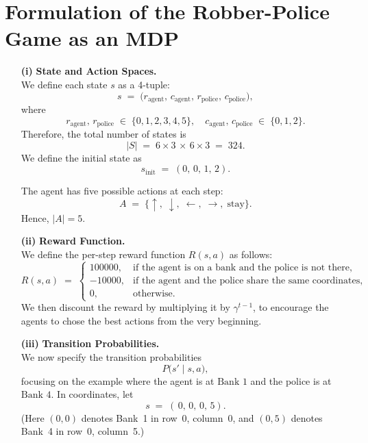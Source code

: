 \section*{Formulation of the Robber-Police Game as an MDP}

\begin{enumerate}

  \item[\textbf{(i)}]
    \textbf{State and Action Spaces.} \\
    We define each state \(s\) as a 4-tuple:
    \[
      s \;=\; \bigl(r_{\text{agent}},\,c_{\text{agent}},\,r_{\text{police}},\,c_{\text{police}}\bigr),
    \]
    where
    \[
      r_{\text{agent}},\,r_{\text{police}} \;\in\;\{0,1,2,3,4,5\},
      \quad
      c_{\text{agent}},\,c_{\text{police}} \;\in\;\{0,1,2\}.
    \]
    Therefore, the total number of states is
    \[
      |S| \;=\; 6 \times 3 \,\times\, 6 \times 3 \;=\; 324.
    \]
    We define the initial state as
    \[
      s_{\text{init}} \;=\; (0,\,0,\,1,\,2).
    \]

    The agent has five possible actions at each step:
    \[
      A \;=\; \{\uparrow,\;\downarrow,\;\leftarrow,\;\rightarrow,\;\text{stay}\}.
    \]
    Hence, \(\lvert A \rvert = 5\).

  \item[\textbf{(ii)}]
    \textbf{Reward Function.} \\
    We define the per-step reward function \(R(s,a)\) as follows:
    \[
      R(s, a) \;=\;
      \begin{cases}
        100000, & \text{if the agent is on a bank and the police is not there,} \\
        -10000, & \text{if the agent and the police share the same coordinates,} \\
        0, & \text{otherwise.}
      \end{cases}
    \]
    We then discount the reward by multiplying it by \(\gamma^{t-1}\), to encourage the agents to chose the best actions from the very beginning.

  \item[\textbf{(iii)}]
    \textbf{Transition Probabilities.} \\
    We now specify the transition probabilities
    \[
      P\bigl(s' \mid s, a\bigr),
    \]
    focusing on the example where the agent is at \(\text{Bank 1}\) and the police is at \(\text{Bank 4}\).  In coordinates, let
    \[
      s \;=\; (\,0,\,0,\,0,\,5).
    \]
    (Here \((0,0)\) denotes Bank~1 in row~0, column~0, and \((0,5)\) denotes Bank~4 in row~0, column~5.)


\end{enumerate}
